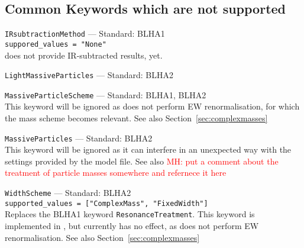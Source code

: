 \subsection{Common Keywords which are not supported}
\begin{basedescript}{\desclabelstyle{\pushlabel}}
    \item[\hspace{-1em}]\colorbox{gray!30}{\lstinline[style=in]|IRsubtractionMethod|} --- Standard: BLHA1\vspace{0.1cm}\\
        \lstinline[style=in]|suppored_values = "None"|\\
        \gosam does not provide IR-subtracted results, yet.
    \item[\hspace{-1em}]\colorbox{gray!30}{\lstinline[style=in]|LightMassiveParticles|} --- Standard: BLHA2\vspace{0.1cm}
    \item[\hspace{-1em}]\colorbox{gray!30}{\lstinline[style=in]|MassiveParticleScheme|} --- Standard: BLHA1, BLHA2 \vspace{0.1cm}\\
        This keyword will be ignored as \gosam does not perform EW renormalisation, for which the mass scheme becomes relevant. See also Section~\ref{sec:complexmasses}
    \item[\hspace{-1em}]\colorbox{gray!30}{\lstinline[style=in]|MassiveParticles|} --- Standard: BLHA2\vspace{0.1cm}\\
        This keyword will be ignored as it can interfere in an unexpected way with the settings provided by the model file. See also \textcolor{red}{MH: put a comment about the treatment of particle masses somewhere and refernece it here}
    \item[\hspace{-1em}]\colorbox{gray!30}{\lstinline[style=in]|WidthScheme|} --- Standard: BLHA2\vspace{0.1cm}\\
        \lstinline[style=in]|supported_values = ["ComplexMass", "FixedWidth"]|\\
        Replaces the BLHA1 keyword \texttt{ResonanceTreatment}. This keyword is implemented in \gosam, but currently has no effect, as \gosam does not perform EW renormalisation. See also Section~\ref{sec:complexmasses}
\end{basedescript}
